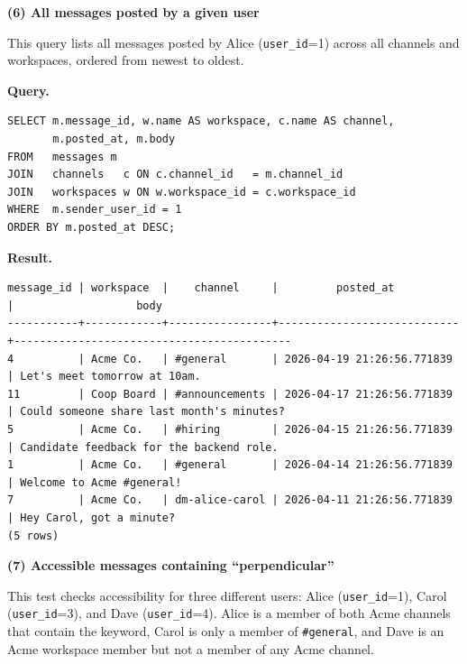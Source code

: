 \documentclass[11pt,letterpaper]{article}
\begin{document}
\noindent\textbf{(6) All messages posted by a given user}

This query lists all messages posted by Alice (\texttt{user\_id}=1) across all
channels and workspaces, ordered from newest to oldest.

\noindent\textbf{Query.}
\begin{lstlisting}
SELECT m.message_id, w.name AS workspace, c.name AS channel,
       m.posted_at, m.body
FROM   messages m
JOIN   channels   c ON c.channel_id   = m.channel_id
JOIN   workspaces w ON w.workspace_id = c.workspace_id
WHERE  m.sender_user_id = 1
ORDER BY m.posted_at DESC;
\end{lstlisting}

\noindent\textbf{Result.}
\begin{lstlisting}[style=result]
message_id | workspace  |    channel     |         posted_at          |                   body
-----------+------------+----------------+----------------------------+-------------------------------------------
4          | Acme Co.   | #general       | 2026-04-19 21:26:56.771839 | Let's meet tomorrow at 10am.
11         | Coop Board | #announcements | 2026-04-17 21:26:56.771839 | Could someone share last month's minutes?
5          | Acme Co.   | #hiring        | 2026-04-15 21:26:56.771839 | Candidate feedback for the backend role.
1          | Acme Co.   | #general       | 2026-04-14 21:26:56.771839 | Welcome to Acme #general!
7          | Acme Co.   | dm-alice-carol | 2026-04-11 21:26:56.771839 | Hey Carol, got a minute?
(5 rows)
\end{lstlisting}

\noindent\textbf{(7) Accessible messages containing ``perpendicular''}

This test checks accessibility for three different users: Alice
(\texttt{user\_id}=1), Carol (\texttt{user\_id}=3), and Dave
(\texttt{user\_id}=4). Alice is a member of both Acme channels that contain the
keyword, Carol is only a member of \texttt{\#general}, and Dave is an Acme
workspace member but not a member of any Acme channel.
\end{document}
